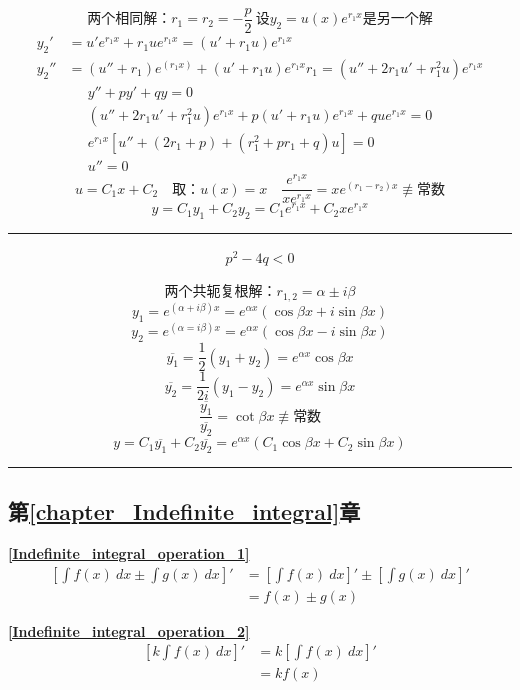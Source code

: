 \hfill
\vline
\begin{minipage}{.8\textwidth}
	$$\mbox{两个相同解：}r_1=r_2=-\frac{p}{2}\ \mbox{设}y_2=u(x)e^{r_1x}\mbox{是另一个解}$$
	\begin{align*}
		y_2'&=u'e^{r_1x}+r_1ue^{r_1x}=(u'+r_1u)e^{r_1x}\\
		y_2''&=(u''+r_1)e^(r_1x)+(u'+r_1u)e^{r_1x}r_1=(u''+2r_1u'+r_1^2u)e^{r_1x}
	\end{align*}
	\begin{align*}
		y''+py'+qy=0\\
		(u''+2r_1u'+r_1^2u)e^{r_1x}+p(u'+r_1u)e^{r_1x}+que^{r_1x}=0\\
		e^{r_1x}\left[u''+(2r_1+p)+(r_1^2+pr_1+q)u\right]=0\\
		u''=0
	\end{align*}
	$$u=C_1x+C_2 \quad\mbox{取：}u(x)=x\quad\frac{e^{r_1x}}{xe^{r_1x}}=xe^{(r_1-r_2)x}\not\equiv\mbox{常数}$$
	$$y=C_1y_1+C_2y_2=C_1e^{r_1x}+C_2xe^{r_1x}$$
\end{minipage}
\noindent\rule[\fill]{\textwidth}{0.4pt}
\begin{minipage}{.2\textwidth}
	\begin{align*}
		p^2-4q<0
	\end{align*}
\end{minipage}
\hfill
\vline
\begin{minipage}{.8\textwidth}
	$$\mbox{两个共轭复根解：}r_{1,2}=\alpha\pm i\beta$$
	$$y_1=e^{(\alpha+i\beta)x}=e^{\alpha x}(\cos\beta x+i\sin\beta x)$$
	$$y_2=e^{(\alpha=i\beta)x}=e^{\alpha x}(\cos\beta x-i\sin\beta x)$$
	$$\overline{y_1}=\frac{1}{2}(y_1+y_2)=e^{\alpha x}\cos\beta x$$
	$$\overline{y_2}=\frac{1}{2i}(y_1-y_2)=e^{\alpha x}\sin\beta x$$
	$$\frac{\overline{y_1}}{\overline{y_2}}=\cot\beta x\not\equiv\mbox{常数}$$
	$$y=C_1\overline{y_1}+C_2\overline{y_2}=e^{\alpha x}(C_1\cos\beta x+C_2\sin\beta x)$$
\end{minipage}
\noindent\rule[\fill]{\textwidth}{0.4pt}
\subsection{\centering 第\ref{chapter_Indefinite_integral}章}
\textbf{\large \ref{Indefinite_integral_operation_1}}
\begin{align*}
    \left[\int f(x)\ dx \pm \int g(x)\ dx\right]'&=\left[\int f(x) \ dx\right]'\pm \left[\int g(x) \ dx\right]'\\
    &=f(x) \pm g(x)
\end{align*}

\textbf{\large \ref{Indefinite_integral_operation_2}}
\begin{align*}
    \left[k\int f(x)\ dx\right]'&=k\left[\int f(x)\ dx\right]'\\
    &=kf(x)
\end{align*}

